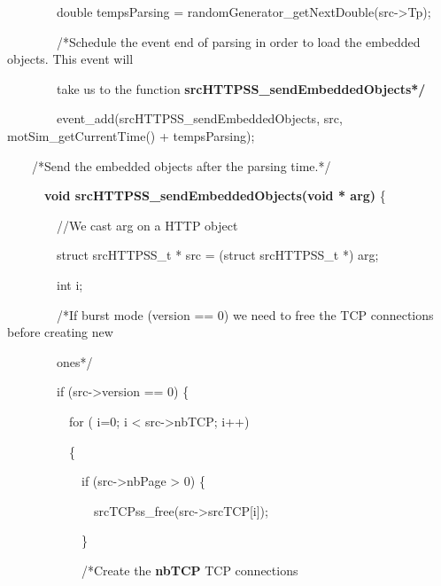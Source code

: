 \documentclass[a4paper]{article}
\begin{document}
{
\ \ \ \ \ \ \ \ double tempsParsing = randomGenerator\_getNextDouble(src-{\textgreater}Tp);}

\bigskip

{
\ \ \ \ \ \ \ \ /*Schedule the event end of parsing in order to load the embedded objects. This event will}


{
\ \ \ \ \ \ \ \ take us to the function \textbf{srcHTTPSS\_sendEmbeddedObjects*/}}

{
\ \ \ \ \ \ \ \ event\_add(srcHTTPSS\_sendEmbeddedObjects, src, motSim\_getCurrentTime() + tempsParsing);}

\pagebreak

{
\ \ \ \ /*Send the embedded objects after the parsing time.*/}

{
\ \ \ \ \ \ \textbf{void srcHTTPSS\_sendEmbeddedObjects(void * arg)} \{}

\bigskip

{
\ \ \ \ \ \ \ \ //We cast arg on a HTTP object}

{
\ \ \ \ \ \ \ \ struct srcHTTPSS\_t * src = (struct srcHTTPSS\_t *) arg;}

\bigskip

{
\ \ \ \ \ \ \ \ int i;}


\bigskip

{
\ \ \ \ \ \ \ \ /*If burst mode (version == 0) we need to free the TCP connections before creating new}

{
\ \ \ \ \ \ \ \ ones*/}

{
\ \ \ \ \ \ \ \ if (src-{\textgreater}version == 0) \{}

{
\ \ \ \ \ \ \ \ \ \ for ( i=0; i {\textless} src-{\textgreater}nbTCP; i++) }

{
\ \ \ \ \ \ \ \ \ \ \{}

{
\ \ \ \ \ \ \ \ \ \ \ \ if (src-{\textgreater}nbPage {\textgreater} 0) \{}

{
\ \ \ \ \ \ \ \ \ \ \ \ \ \ srcTCPss\_free(src-{\textgreater}srcTCP[i]);}

{
\ \ \ \ \ \ \ \ \ \ \ \ \}}

{
\ \ \ \ \ \ \ \ \ \ \ \ /*Create the \textbf{nbTCP} TCP connections}
\end{document}
